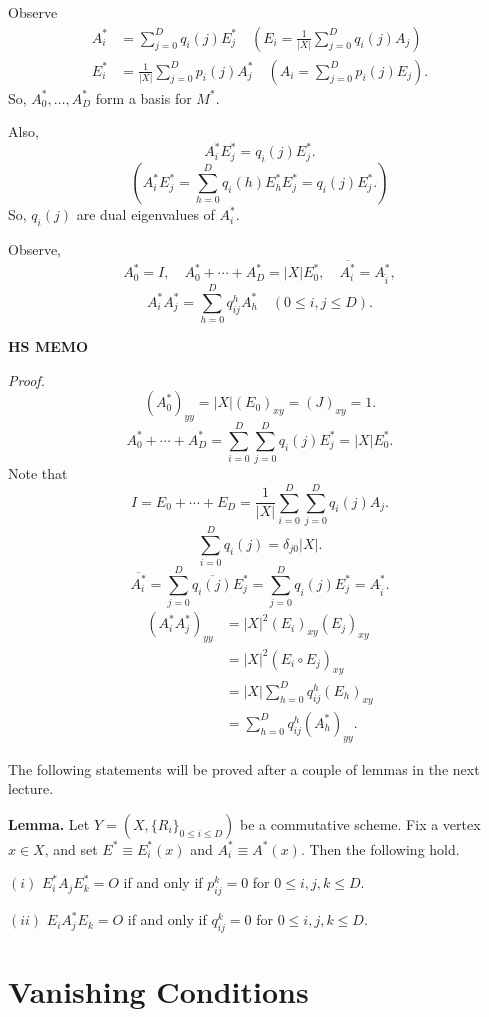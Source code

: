 \documentclass[
]{book}
\theoremstyle{definition}
\theoremstyle{definition}
\theoremstyle{definition}
\theoremstyle{definition}
\theoremstyle{remark}
\begin{document}
Observe
\begin{align}
A^*_i & = \sum_{j=0}^Dq_i(j)E^*_j \quad \left(E_i = \frac{1}{|X|}\sum_{j=0}^D q_i(j)A_j\right)\\
E^*_i & = \frac{1}{|X|}\sum_{j=0}^D p_i(j)A^*_j \quad \left(A_i = \sum_{j=0}^D p_i(j)E_j\right).
\end{align}
So, \(A^*_0, \ldots, A^*_D\) form a basis for \(M^*\).

Also,
\[A^*_iE^*_j = q_i(j)E^*_j.\]
\[\left(A^*_iE^*_j = \sum_{h=0}^D q_i(h)E^*_hE^*_j = q_i(j)E^*_j.\right)\]
So, \(q_i(j)\) are dual eigenvalues of \(A^*_i\).

Observe,
\[A^*_0 = I, \quad A^*_0 + \cdots + A^*_D = |X|E^*_0, \quad \overline{A^*_i} = A^*_{\hat{i}},\]
\[A^*_iA^*_j = \sum_{h=0}^D q^h_{ij}A^*_h \quad (0\leq i,j\leq D).\]

\textbf{HS MEMO}

\emph{Proof.}
\[(A^*_0)_{yy} = |X|(E_0)_{xy} = (J)_{xy} = 1.\]
\[A^*_0 + \cdots + A^*_D = \sum_{i=0}^D\sum_{j=0}^D q_i(j)E^*_j = |X|E^*_0.\]
Note that
\[I = E_0 + \cdots + E_D = \frac{1}{|X|}\sum_{i=0}^D\sum_{j=0}^D q_i(j)A_j.\]
\[\sum_{i=0}^D q_i(j) = \delta_{j0}|X|.\]
\[\overline{A^*_i} = \sum_{j=0}^D\overline{q_i(j)}E^*_j = \sum_{j=0}^D q_{\hat{i}}(j)E^*_j = A^*_{\hat{i}}.\]
\begin{align}
(A^*_iA^*_j)_{yy} & = |X|^2 (E_i)_{xy}(E_j)_{xy}\\
& = |X|^2(E_i\circ E_j)_{xy}\\
& = |X|\sum_{h=0}^D q^h_{ij}(E_h)_{xy}\\
& = \sum_{h=0}^D q^h_{ij}(A^*_h)_{yy}.
\end{align}

The following statements will be proved after a couple of lemmas in the next lecture.

\textbf{Lemma.}
Let \(Y = (X, \{R_i\}_{0\leq i\leq D})\) be a commutative scheme. Fix a vertex \(x\in X\), and set \(E^*\equiv E^*_i(x)\) and \(A^*_i \equiv A^*(x)\).
Then the following hold.

\((i)\) \(E^*_iA_jE^*_k = O\) if and only if \(p^k_{ij} = 0\) for \(0\leq i,j,k\leq D\).

\((ii)\) \(E_iA^*_jE_k = O\) if and only if \(q^k_{ij} = 0\) for \(0\leq i,j,k\leq D\).

\hypertarget{lec20}{%
\chapter{Vanishing Conditions}\label{lec20}}
\end{document}
